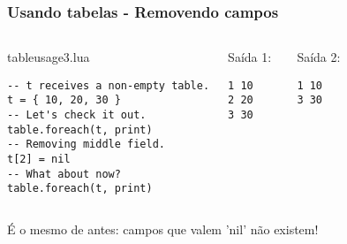 \documentclass[brazil]{beamer}
\begin{document}
\begin{frame}[fragile]
  \frametitle{Usando tabelas - Removendo campos}
  \pause
  \begin{columns}
      \begin{block}{tableusage3.lua}
        \begin{lstlisting}
-- t receives a non-empty table.
t = { 10, 20, 30 }
-- Let's check it out.
table.foreach(t, print)
-- Removing middle field.
t[2] = nil
-- What about now?
table.foreach(t, print)
        \end{lstlisting}
      \end{block}
    \pause
      \begin{block}{Saída 1:}
        \begin{verbatim}
1 10
2 20
3 30    \end{verbatim}
      \end{block}
      \begin{block}{Saída 2:}
        \begin{verbatim}
1 10
3 30    \end{verbatim}
      \end{block}
  \end{columns}
  \pause
  \begin{center}
    É o mesmo de antes: campos que valem 'nil' não existem!
  \end{center}
\end{frame}


\end{document}
